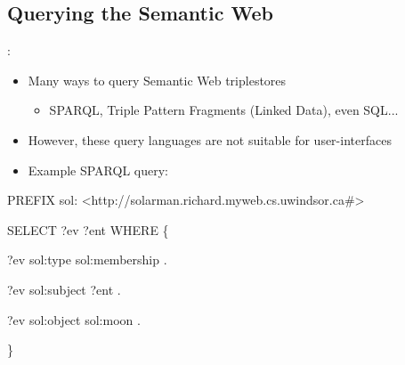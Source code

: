 \documentclass[logoontitle,tabu,supertabular,aspectratio=43]{preney-uwindsor-beamer}
\begin{document}
    \subsection{Querying the Semantic Web}
    \begin{frame}{\insertsection: \insertsubsection}
        \begin{itemize}
            \item Many ways to query Semantic Web triplestores
            \begin{itemize}
            \item SPARQL, Triple Pattern Fragments (Linked Data), even SQL...
            \end{itemize}
            \item However, these query languages are not suitable for user-interfaces
            \item Example SPARQL query:
        \end{itemize}
    \begin{block}

        \ttfamily

        PREFIX sol: <http://solarman.richard.myweb.cs.uwindsor.ca\#>

        SELECT ?ev ?ent WHERE \{

        \hspace{5em}    ?ev sol:type sol:membership .

        \hspace{5em}    ?ev sol:subject ?ent .

        \hspace{5em}    ?ev sol:object sol:moon .

        \}
    \end{block}
    \end{frame}


\end{document}
